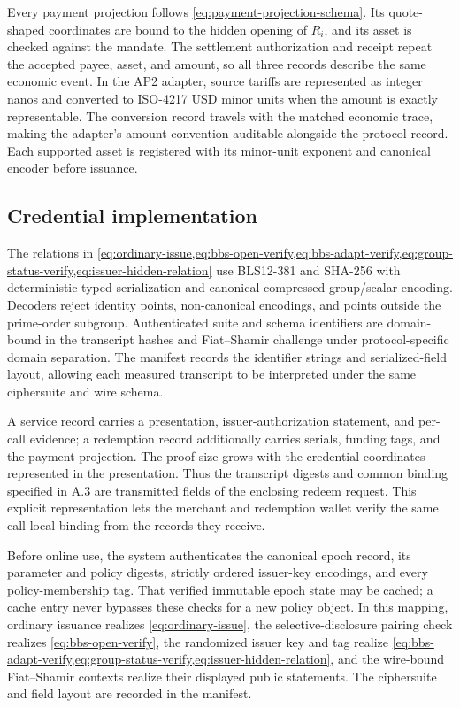 \documentclass[letterpaper]{article}
\begin{document}
Every payment projection follows
\cref{eq:payment-projection-schema}. Its quote-shaped coordinates are bound to
the hidden opening of \(R_i\), and its asset is checked against the mandate.
The settlement authorization and receipt repeat the accepted payee, asset,
and amount, so all three records describe the same economic event. In the AP2 adapter, source
tariffs are represented as integer nanos and converted to ISO-4217 USD minor
units when the amount is exactly representable. The conversion record travels
with the matched economic trace, making the adapter's amount convention
auditable alongside the protocol record. Each supported asset is registered
with its minor-unit exponent and canonical encoder before issuance.

\subsection{Credential implementation}

The relations in
\cref{eq:ordinary-issue,eq:bbs-open-verify,eq:bbs-adapt-verify,eq:group-status-verify,eq:issuer-hidden-relation}
use BLS12-381 and SHA-256 with deterministic typed
serialization and canonical compressed group/scalar encoding. Decoders reject
identity points, non-canonical encodings, and points outside the prime-order
subgroup. Authenticated suite and schema identifiers are domain-bound in the
transcript hashes and Fiat--Shamir challenge under protocol-specific domain
separation. The manifest records the identifier strings and
serialized-field layout, allowing each measured transcript to be interpreted
under the same ciphersuite and wire schema.

A service record carries a presentation, issuer-authorization statement, and
per-call evidence; a redemption record additionally carries serials, funding
tags, and the payment projection. The proof size grows
with the credential coordinates represented in the presentation. Thus the
transcript digests and common binding specified in A.3 are transmitted fields
of the enclosing redeem request. This explicit representation lets the
merchant and redemption wallet verify the same call-local binding from the
records they receive.

Before online use, the system authenticates the canonical epoch record,
its parameter and policy digests, strictly ordered issuer-key encodings, and
every policy-membership tag.  That verified immutable epoch state may be
cached; a cache entry never bypasses these checks for a new policy object.  In
this mapping, ordinary issuance realizes \cref{eq:ordinary-issue}, the
selective-disclosure pairing check realizes \cref{eq:bbs-open-verify}, the
randomized issuer key and tag realize
\cref{eq:bbs-adapt-verify,eq:group-status-verify,eq:issuer-hidden-relation},
and the wire-bound Fiat--Shamir contexts realize their displayed public
statements. The ciphersuite and field layout are recorded in the manifest.
\end{document}
